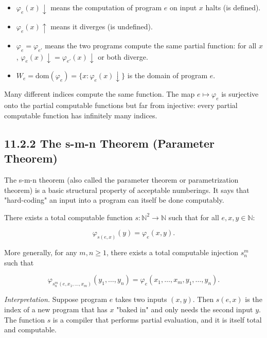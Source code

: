 \begin{itemize}
  \item $\varphi_e(x)\!\downarrow$ means the computation of program $e$ on input $x$ halts (is defined).
  \item $\varphi_e(x)\!\uparrow$ means it diverges (is undefined).
  \item $\varphi_e = \varphi_{e'}$ means the two programs compute the same partial function: for all $x$, $\varphi_e(x)\!\downarrow = \varphi_{e'}(x)\!\downarrow$ or both diverge.
  \item $W_e = \text{dom}(\varphi_e) = \{ x : \varphi_e(x)\!\downarrow\} $ is the domain of program $e$.
\end{itemize}

\begin{remark}
Many different indices compute the same function. The map $e \mapsto \varphi_e$ is surjective onto the partial computable functions but far from injective: every partial computable function has infinitely many indices.
\end{remark}

\subsection{11.2.2 The s-m-n Theorem (Parameter Theorem)}

The s-m-n theorem (also called the parameter theorem or parametrization theorem) is a basic structural property of acceptable numberings. It says that "hard-coding" an input into a program can itself be done computably.

\begin{theorem}
There exists a total computable function $s: \mathbb{N}^2 \to \mathbb{N}$ such that for all $e, x, y \in \mathbb{N}$:

\[
\varphi_{s(e, x)}(y) = \varphi_e(x, y).
\]

More generally, for any $m, n \geq 1$, there exists a total computable injection $s^m_n$ such that

\[
\varphi_{s^m_n(e, x_1, \ldots, x_m)}(y_1, \ldots, y_n) = \varphi_e(x_1, \ldots, x_m, y_1, \ldots, y_n).
\]

\textit{Interpretation.} Suppose program $e$ takes two inputs $(x, y)$. Then $s(e, x)$ is the index of a new program that has $x$ "baked in" and only needs the second input $y$. The function $s$ is a compiler that performs partial evaluation, and it is itself total and computable.
\end{theorem}

